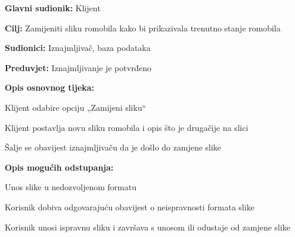 						\noindent {}
						\begin{packed_item}
							
							\item \textbf{Glavni sudionik: }Klijent
							\item  \textbf{Cilj: }Zamijeniti sliku romobila kako bi prikazivala trenutno stanje romobila
							\item  \textbf{Sudionici: }Iznajmljivač, baza podataka
							\item  \textbf{Preduvjet: }Iznajmljivanje je potvrđeno
							\item  \textbf{Opis osnovnog tijeka:}
							
							\item[] \begin{packed_enum}
								
								\item Klijent odabire opciju „Zamijeni sliku“ 
								\item Klijent postavlja novu sliku romobila i opis što je drugačije na slici 
								\item Šalje se obavijest iznajmljivaču da je došlo do zamjene slike   
							\end{packed_enum}
							
							\item  \textbf{Opis mogućih odstupanja:}
							
							\item[] \begin{packed_item}
								
								\item[2.a] Unos slike u nedozvoljenom formatu 
								\item[] \begin{packed_enum}
									
									\item Korisnik dobiva odgovarajuću obavijest o neispravnosti formata slike 
									\item Korisnik unosi ispravnu sliku i završava s unosom ili odustaje od zamjene slike 
									
								\end{packed_enum}		
							\end{packed_item}
						\end{packed_item}
						\noindent {}
